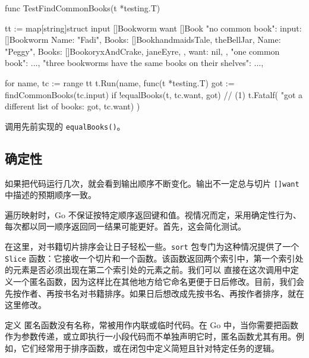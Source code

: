 \begin{gocode}[title={代码清单 3.17 \texttt{bookworms\_internal\_test.go}：测试 \texttt{findCommonBooks()}}]
func TestFindCommonBooks(t *testing.T) {
    tt := map[string]struct {
        input []Bookworm
        want  []Book
    }{
        "no common book": {
            input: []Bookworm{
                {Name: "Fadi", Books: []Book{handmaidsTale, theBellJar}},
                {Name: "Peggy", Books: []Book{oryxAndCrake, janeEyre}},
            },
            want: nil,
        },
        "one common book": {...},
        "three bookworms have the same books on their shelves": {...},
    }

    for name, tc := range tt {
        t.Run(name, func(t *testing.T) {
            got := findCommonBooks(tc.input)
            if !equalBooks(t, tc.want, got) { // (1)
                t.Fatalf(
                    "got a different list of books: %
                    got, tc.want)
            }
        })
    }
}
\end{gocode}

\begin{codeannotations}
  \item 调用先前实现的 \texttt{equalBooks()}。
\end{codeannotations}

\subsection{确定性}

如果把代码运行几次，就会看到输出顺序不断变化。输出不一定总与切片 \texttt{[]want} 中描述的预期顺序一致。

遍历映射时，Go 不保证按特定顺序返回键和值。视情况而定，采用确定性行为、每次都以同一顺序返回同一结果可能更好。首先，这会简化测试。

在这里，对书籍切片排序会让日子轻松一些。\texttt{sort} 包专门为这种情况提供了一个 \texttt{Slice} 函数：它接收一个切片和一个函数。该函数返回两个索引中，第一个索引处的元素是否必须出现在第二个索引处的元素之前。我们可以
直接在这次调用中定义一个匿名函数，因为这样比在其他地方给它命名更便于日后修改。目前，我们会先按作者、再按书名对书籍排序。如果日后想改成先按书名、再按作者排序，就在这里修改。

\begin{infobox}{定义}
匿名函数没有名称，常被用作内联或临时代码。在 Go 中，当你需要把函数作为参数传递，或立即执行一小段代码而不单独声明它时，匿名函数尤其有用。例如，它们经常用于排序函数，或在闭包中定义简短且针对特定任务的逻辑。
\end{infobox}

